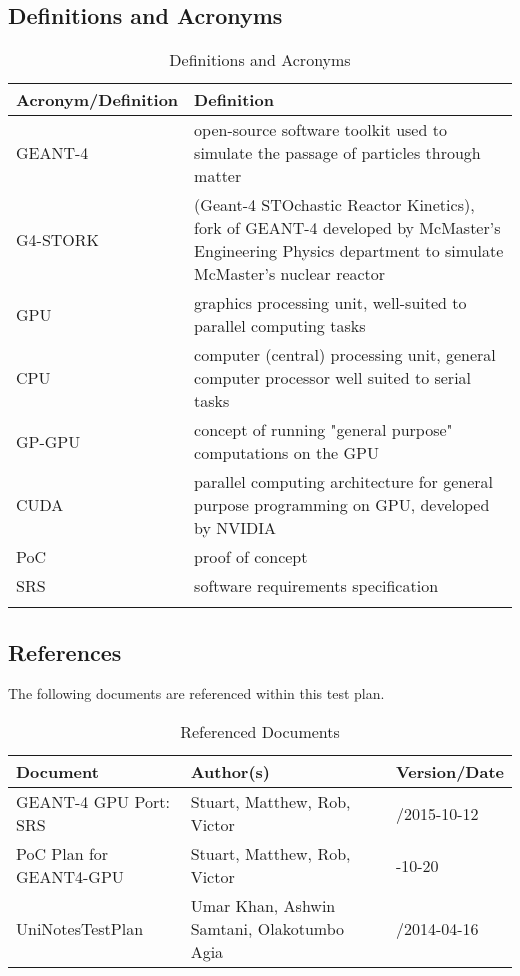 \documentclass[12pt]{article}
\begin{document}
\subsection{Definitions and Acronyms} %
\begin{centering}
\begin{longtable}{>{\raggedright\arraybackslash}p{}>{\raggedright\arraybackslash}p{}}
\caption{Definitions and Acronyms}\label{Table_Acronyms}\\
\Xhline{2\arrayrulewidth}
\bf Acronym/Definition & \bf Definition\\\hline
GEANT-4 & open-source software toolkit used to simulate the passage of particles through matter\\
G4-STORK & (Geant-4 STOchastic Reactor Kinetics), fork of GEANT-4 developed by McMaster's Engineering Physics department to simulate McMaster's nuclear reactor\\
GPU & graphics processing unit, well-suited to parallel computing tasks\\
CPU & computer (central) processing unit, general computer processor well suited to serial tasks\\
GP-GPU & concept of running "general purpose" computations on the GPU\\
CUDA & parallel computing architecture for general purpose programming on GPU, developed by NVIDIA\\
PoC & proof of concept\\
SRS & software requirements specification\\
\Xhline{2\arrayrulewidth}
\end{longtable}
\end{centering}

\subsection{References}%
The following documents are referenced within this test plan.
\begin{centering}
\begin{longtable}{>{\raggedright\arraybackslash}p{}>{\raggedright\arraybackslash}p{}>{\raggedright\arraybackslash}p{}}
\caption{Referenced Documents}\label{Table_References}\\
\toprule
\bf Document & \bf Author(s) & \bf Version/Date\\\midrule
GEANT-4 GPU Port: SRS & Stuart, Matthew, Rob, Victor & 0/2015-10-12\\
PoC Plan for GEANT4-GPU & Stuart, Matthew, Rob, Victor & 2015-10-20\\
UniNotesTestPlan & Umar Khan, Ashwin Samtani, Olakotumbo Agia & 1/2014-04-16\\
\bottomrule
\end{longtable}
\end{centering}
\end{document}
